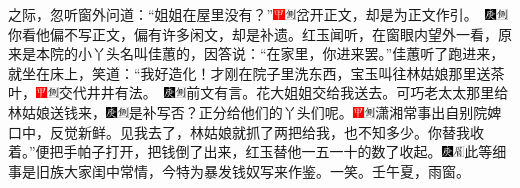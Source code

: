 之际，忽听窗外问道：``姐姐在屋里没有？''{\includegraphics[width=3mm]{../Images/00002}\includegraphics[width=3mm]{../Images/00011}\footnotesize \kaishu 岔开正文，却是为正文作引。　\includegraphics[width=3mm]{../Images/00004}\includegraphics[width=3mm]{../Images/00011}\footnotesize \kaishu 你看他偏不写正文，偏有许多闲文，却是补遗。}红玉闻听，在窗眼内望外一看，原来是本院的小丫头名叫佳蕙的，因答说：``在家里，你进来罢。''佳蕙听了跑进来，就坐在床上，笑道：``我好造化！才刚在院子里洗东西，宝玉叫往林姑娘那里送茶叶，{\includegraphics[width=3mm]{../Images/00002}\includegraphics[width=3mm]{../Images/00011}\footnotesize \kaishu 交代井井有法。　\includegraphics[width=3mm]{../Images/00004}\includegraphics[width=3mm]{../Images/00011}\footnotesize \kaishu 前文有言。}花大姐姐交给我送去。可巧老太太那里给林姑娘送钱来，{\includegraphics[width=3mm]{../Images/00004}\includegraphics[width=3mm]{../Images/00011}\footnotesize \kaishu 是补写否？}正分给他们的丫头们呢。{\includegraphics[width=3mm]{../Images/00002}\includegraphics[width=3mm]{../Images/00011}\footnotesize \kaishu 潇湘常事出自别院婢口中，反觉新鲜。}见我去了，林姑娘就抓了两把给我，也不知多少。你替我收着。''便把手帕子打开，把钱倒了出来，红玉替他一五一十的数了收起。{\includegraphics[width=3mm]{../Images/00004}\includegraphics[width=3mm]{../Images/00010}\footnotesize \kaishu 此等细事是旧族大家闺中常情，今特为暴发钱奴写来作鉴。一笑。壬午夏，雨窗。}

